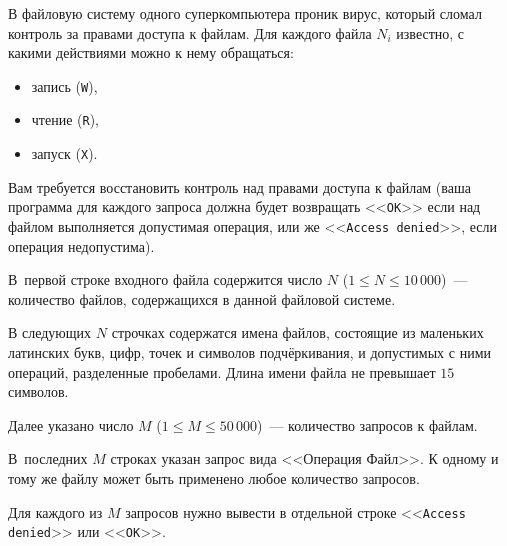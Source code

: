 В файловую систему одного суперкомпьютера проник вирус, который сломал контроль
за правами доступа к файлам. Для каждого файла $N_i$ известно, с какими
действиями можно к нему обращаться: 
\begin{itemize}
\item запись (\texttt{W}),
\item чтение (\texttt{R}), 
\item запуск (\texttt{X}). 
\end{itemize}

Вам требуется восстановить контроль над правами доступа к файлам (ваша
программа для каждого запроса должна будет возвращать <<\texttt{OK}>> если над
файлом выполняется допустимая операция, или  же <<\texttt{Access denied}>>, если
операция недопустима).

\InputFile

В~первой строке входного файла содержится  число $N$ ($1 \le N \le
10\,000$)~--- количество файлов, содержащихся в данной файловой системе.

В следующих $N$ строчках содержатся имена файлов, состоящие из маленьких
латинских букв, цифр, точек и символов подчёркивания, и допустимых с ними
операций, разделенные пробелами. Длина имени файла не превышает $15$ символов.

Далее указано число $M$ ($1 \le M \le 50\,000$)~--- количество
запросов к файлам.

В~последних $M$ строках указан запрос вида <<Операция Файл>>. К одному и тому же
файлу может быть применено любое количество запросов.

\OutputFile

Для каждого из $M$ запросов нужно вывести в отдельной строке <<\texttt{Access denied}>> или <<\texttt{OK}>>.

\SAMPLES
